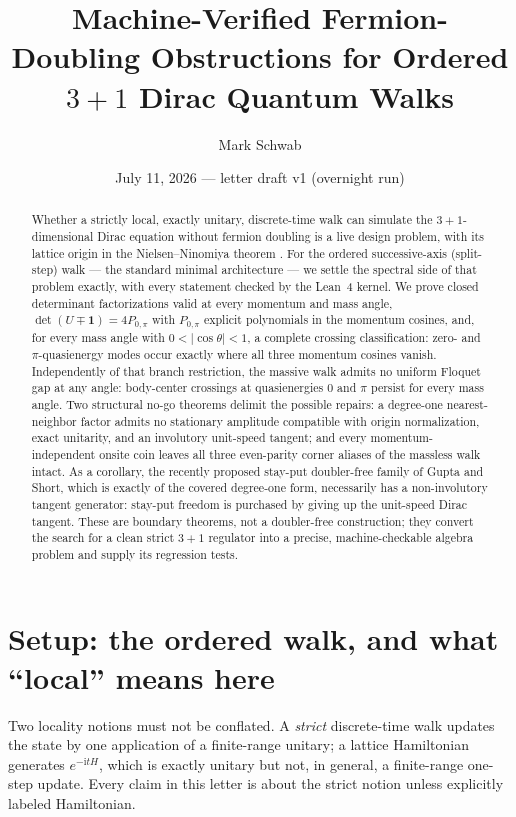 \documentclass[11pt]{article}
\title{Machine-Verified Fermion-Doubling Obstructions for Ordered $3+1$
Dirac Quantum Walks}
\author{Mark Schwab}
\date{July 11, 2026 --- letter draft v1 (overnight run)}
\newcommand{\ii}{\mathrm{i}}
\newcommand{\id}{\mathbf{1}}
\begin{document}
\maketitle

\begin{abstract}
Whether a strictly local, exactly unitary, discrete-time walk can simulate
the $3+1$-dimensional Dirac equation without fermion doubling is a live
design problem, with its lattice origin in the Nielsen--Ninomiya theorem
\cite{NielsenNinomiya}.  For the ordered successive-axis (split-step) walk --- the
standard minimal architecture --- we settle the spectral side of that
problem exactly, with every statement checked by the Lean~4 kernel.  We
prove closed determinant factorizations valid at every momentum and mass
angle, $\det(U\mp\id)=4P_{0,\pi}$ with $P_{0,\pi}$ explicit polynomials in
the momentum cosines, and, for every mass angle with $0<|\cos\theta|<1$, a
complete crossing classification: zero- and $\pi$-quasienergy modes occur
exactly where all three momentum cosines vanish.  Independently of that
branch restriction, the massive walk admits no uniform Floquet gap at any
angle: body-center crossings at quasienergies
$0$ and $\pi$ persist for every mass angle.  Two structural no-go theorems
delimit the possible repairs: a degree-one nearest-neighbor factor admits no
stationary amplitude compatible with origin normalization, exact unitarity,
and an involutory unit-speed tangent; and every momentum-independent onsite
coin leaves all three even-parity corner aliases of the massless walk
intact.  As a corollary, the recently proposed stay-put doubler-free family
of Gupta and Short, which is exactly of the covered degree-one form,
necessarily has a non-involutory tangent generator: stay-put freedom is
purchased by giving up the unit-speed Dirac tangent.  These are boundary
theorems, not a doubler-free construction; they convert the search for a
clean strict $3+1$ regulator into a precise, machine-checkable algebra
problem and supply its regression tests.
\end{abstract}

\section{Setup: the ordered walk, and what ``local'' means here}
\label{sec:setup}

Two locality notions must not be conflated.  A \emph{strict} discrete-time
walk updates the state by one application of a finite-range unitary; a
lattice Hamiltonian generates $e^{-\ii tH}$, which is exactly unitary but
not, in general, a finite-range one-step update.  Every claim in this
letter is about the strict notion unless explicitly labeled Hamiltonian.
\end{document}
